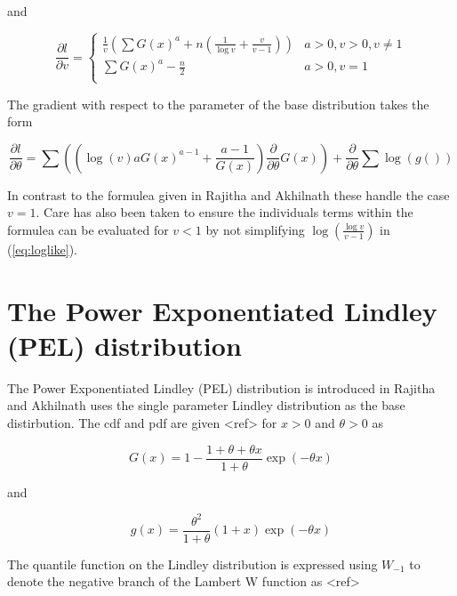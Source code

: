 and

\begin{equation}
  \frac{\partial l}{\partial v} = \left\{
  \begin{array}{cl}          
  \frac{1}{v}\left( \sum G\left(x\right)^{a} +n \left(\frac{1}{\log{v}} + \frac{v}{v-1}\right)\right) & a>0,v>0,v\neq1\\
  \sum G\left(x\right)^{a} - \frac{n}{2} & a>0,v=1\\
    \end{array}            
    \right.
\end{equation}

The gradient with respect to the parameter of the base distribution takes the form

\begin{equation}
\frac{\partial l}{\partial \theta} =
\sum \left( \left( \log\left(v\right)a G\left(x\right)^{a-1} + \frac{a-1}{G\left(x\right)}\right)
\frac{\partial }{\partial \theta} G\left(x\right)\right) +
\frac{\partial }{\partial \theta} \sum \log\left(g\left(\right)\right)
\end{equation}

In contrast to the formulea given in Rajitha and Akhilnath\supercite{Rajitha2022} these handle the case $v=1$. Care has also been taken to ensure the individuals terms within the formulea can be evaluated for $v<1$ by not simplifying $\log\left(\frac{\log v}{v-1}\right)$ in (\ref{eq:loglike}).


\section{The Power Exponentiated Lindley (PEL) distribution}

The Power Exponentiated Lindley (PEL) distribution is introduced in Rajitha and Akhilnath\supercite{Rajitha2022} uses the single parameter Lindley distribution as the base distirbution. The cdf and pdf are given <ref> for $x>0$ and $\theta>0$ as

\begin{equation}
G\left(x\right) = 1 - \frac{1+\theta + \theta x}{1+\theta}\exp\left(-\theta x\right)
\end{equation}

and

\begin{equation}
g\left(x\right) = \frac{ \theta^2 }{1+\theta} \left(1+x\right)\exp\left(-\theta x\right)
\end{equation}

The quantile function on the Lindley distribution is expressed using $W_{-1}$ to denote the negative branch of the Lambert W function as <ref>

